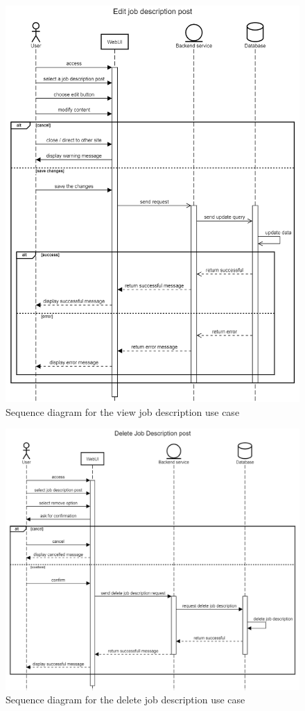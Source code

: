 \documentclass[a4paper]{article}
\begin{document}
\begin{figure}[H]
    \centering
    \includegraphics[width=1.0\textwidth]{Edit job description post.png}
    \caption{Sequence diagram for the view job description use case}
    \label{fig:fig15}
\end{figure}

\begin{figure}[H]
    \centering
    \includegraphics[width=1.0\textwidth]{Delete job description post.png}
    \caption{Sequence diagram for the delete job description use case}
    \label{fig:fig16}
\end{figure}
\end{document}

